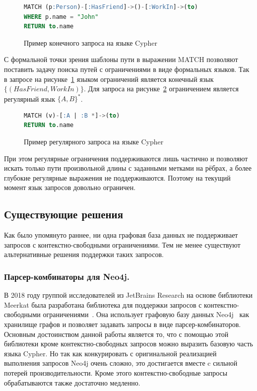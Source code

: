 
\begin{figure}[h]
\begin{lstlisting}[language=sql]
MATCH (p:Person)-[:HasFriend]->()-[:WorkIn]->(to)
WHERE p.name = "John"
RETURN to.name
\end{lstlisting}
\caption{Пример конечного запроса на языке Cypher}
\label{code:cypher_query}
\end{figure}

С формальной точки зрения шаблоны пути в выражении MATCH позволяют поставить задачу поиска путей с ограничениями в виде формальных языков. Так в запросе на рисунке~\ref{code:cypher_query} языком ограничений является конечный язык $\{(HasFriend, WorkIn)\}$. Для запроса на рисунке~\ref{code:cypher_query_2} ограничением является регулярный язык $\{A, B\}^*$. 

\begin{figure}[h]
\begin{lstlisting}[language=sql]
MATCH (v)-[:A | :B *]->(to)
RETURN to.name
\end{lstlisting}
\caption{Пример регулярного запроса на языке Cypher}
\label{code:cypher_query_2}
\end{figure}

При этом регулярные ограничения поддерживаются лишь частично и позволяют искать только пути произвольной длины с заданными метками на рёбрах, а более глубокие регулярные выражения не поддерживаются. Поэтому на текущий момент язык запросов довольно ограничен.

\subsection{Существующие решения}
Как было упомянуто раннее, ни одна графовая база данных не поддерживает запросов с контекстно-свободными ограничениями. Тем не менее существуют альтернативные решения поддержки таких запросов. 

\subsubsection{Парсер-комбинаторы для Neo4j.}\label{sec:pareser-combinators}
В 2018 году группой исследователей из JetBrains Research на основе библиотеки Meerkat была разработана библиотека для поддержки запросов с контекстно-свободными ограничениями~\cite{parser-combinators}. Она использует графовую базу данных Neo4j~\cite{neo4j} как хранилище графов и позволяет задавать запросы в виде парсер-комбинаторов. Основным достоинством данной работы является то, что с помощью этой библиотеки кроме контекстно-свободных запросов можно выразить базовую часть языка Cypher. Но так как конкурировать с оригинальной реализацией выполнения запросов Neo4j очень сложно, это достигается вместе c сильной потерей производительности. Кроме этого контекстно-свободные запросы обрабатываются также достаточно медленно.

